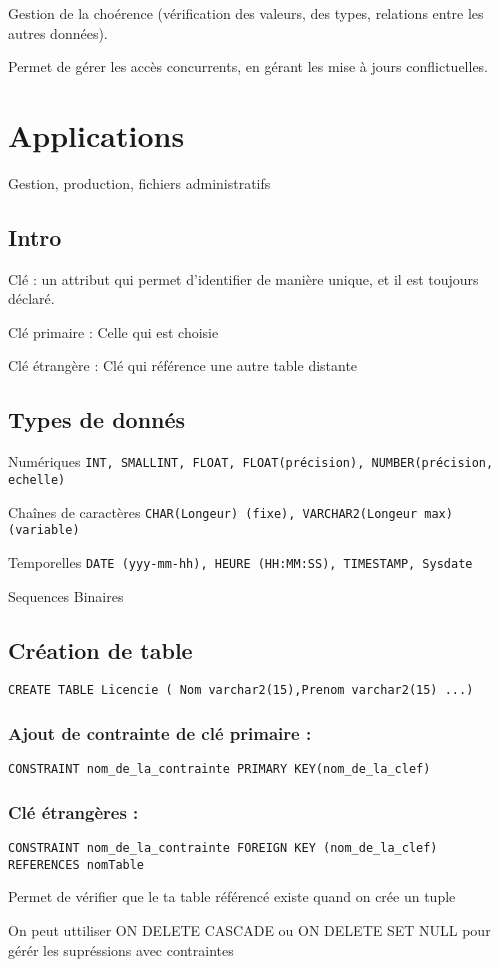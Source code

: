 \documentclass[11pt]{article}
\begin{document}
Gestion de la choérence (vérification des valeurs, des types, relations entre les autres données).

Permet de gérer les accès concurrents, en gérant les mise à jours conflictuelles.

\section{Applications}
Gestion, production, fichiers administratifs

\subsection{Intro}

Clé : un attribut qui permet d'identifier de manière unique, et il est toujours déclaré.

Clé primaire : Celle qui est choisie

Clé étrangère : Clé qui référence une autre table distante

\subsection{Types de donnés}
Numériques {\tt INT, SMALLINT, FLOAT, FLOAT(précision), NUMBER(précision, echelle)}

Chaînes de caractères {\tt CHAR(Longeur) (fixe), VARCHAR2(Longeur max) (variable) }

Temporelles {\tt DATE (yyy-mm-hh), HEURE (HH:MM:SS), TIMESTAMP, Sysdate}

Sequences Binaires

\subsection{Création de table}
{\tt CREATE TABLE Licencie ( Nom varchar2(15),Prenom varchar2(15) ...)}

\subsubsection{Ajout de contrainte de clé primaire :}

{\tt CONSTRAINT nom\_de\_la\_contrainte PRIMARY KEY(nom\_de\_la\_clef)}

\subsubsection{Clé étrangères :}

{\tt CONSTRAINT nom\_de\_la\_contrainte FOREIGN KEY (nom\_de\_la\_clef) REFERENCES nomTable}

Permet de vérifier que le ta table référencé existe quand on crée un tuple

On peut uttiliser ON DELETE CASCADE ou ON DELETE SET NULL pour gérér les supréssions avec contraintes

\subsection{}
\end{document}
